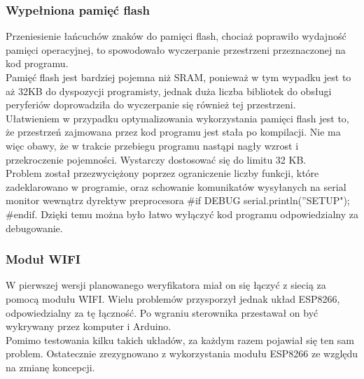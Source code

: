 \documentclass[declaration,shortabstract, mgr]{iithesis}
\begin{document}
\subsubsection{Wypełniona pamięć flash}
\indent Przeniesienie łańcuchów znaków do pamięci flash, chociaż poprawiło wydajność pamięci operacyjnej, to spowodowało wyczerpanie przestrzeni przeznaczonej na kod programu. \\
\indent Pamięć flash jest bardziej pojemna niż SRAM, ponieważ w tym wypadku jest to aż 32KB do dyspozycji programisty, jednak duża liczba bibliotek do obsługi peryferiów doprowadziła do wyczerpanie się również tej przestrzeni. \\
\indent Ułatwieniem w przypadku optymalizowania wykorzystania pamięci flash jest to, że przestrzeń zajmowana przez kod programu jest stała po kompilacji. Nie ma więc obawy, że w trakcie przebiegu programu nastąpi nagły wzrost i przekroczenie pojemności. Wystarczy dostosować się do limitu 32 KB. \\
\indent Problem został przezwyciężony poprzez ograniczenie liczby funkcji, które zadeklarowano w programie, oraz schowanie komunikatów wysyłanych na serial monitor wewnątrz dyrektyw preprocesora \#if DEBUG serial.println(''SETUP"); \#endif. Dzięki temu można było łatwo wyłączyć kod programu odpowiedzialny za debugowanie.\\
\subsubsection{Moduł WIFI}
\indent W pierwszej wersji planowanego weryfikatora miał on się łączyć z siecią za pomocą modułu WIFI. Wielu problemów przysporzył jednak układ ESP8266, odpowiedzialny za tę łączność. Po wgraniu sterownika przestawał on być wykrywany przez komputer i Arduino.\\ 
\indent Pomimo testowania kilku takich układów, za każdym razem pojawiał się ten sam problem. Ostatecznie zrezygnowano z wykorzystania modułu ESP8266 ze względu na zmianę koncepcji.
\end{document}
